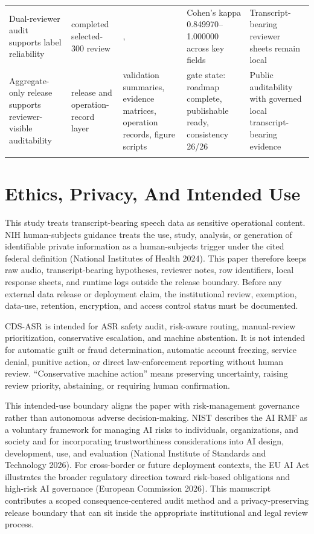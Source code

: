 \documentclass[
]{article}
\begin{document}
\begin{tabularx}{\linewidth}{@{}
  L{1.2000}
  L{1.0000}
  L{1.1000}
  L{0.8000}
  L{0.9000}@{}}
Dual-reviewer audit supports label reliability & completed selected-300
review & \texttt{},
\texttt{} & Cohen's kappa
0.849970--1.000000 across key fields & Transcript-bearing reviewer
sheets remain local \\
Aggregate-only release supports reviewer-visible auditability & release
and operation-record layer & validation summaries, evidence matrices,
operation records, figure scripts & gate state: roadmap complete,
publishable ready, consistency 26/26 & Public auditability with governed
local transcript-bearing evidence \\
\bottomrule\noalign{}
\end{tabularx}

\hypertarget{ethics-privacy-and-intended-use}{%
\section{Ethics, Privacy, And Intended
Use}\label{ethics-privacy-and-intended-use}}

This study treats transcript-bearing speech data as sensitive
operational content. NIH human-subjects guidance treats the use, study,
analysis, or generation of identifiable private information as a
human-subjects trigger under the cited federal definition (National
Institutes of Health 2024). This paper therefore keeps raw audio,
transcript-bearing hypotheses, reviewer notes, row identifiers, local
response sheets, and runtime logs outside the release boundary. Before
any external data release or deployment claim, the institutional review,
exemption, data-use, retention, encryption, and access control status
must be documented.

CDS-ASR is intended for ASR safety audit, risk-aware routing,
manual-review prioritization, conservative escalation, and machine
abstention. It is not intended for automatic guilt or fraud
determination, automatic account freezing, service denial, punitive
action, or direct law-enforcement reporting without human review.
``Conservative machine action'' means preserving uncertainty, raising
review priority, abstaining, or requiring human confirmation.

This intended-use boundary aligns the paper with risk-management
governance rather than autonomous adverse decision-making. NIST
describes the AI RMF as a voluntary framework for managing AI risks to
individuals, organizations, and society and for incorporating
trustworthiness considerations into AI design, development, use, and
evaluation (National Institute of Standards and Technology 2026). For
cross-border or future deployment contexts, the EU AI Act illustrates
the broader regulatory direction toward risk-based obligations and
high-risk AI governance (European Commission 2026). This manuscript
contributes a scoped consequence-centered audit method and a
privacy-preserving release boundary that can sit inside the appropriate
institutional and legal review process.
\end{document}
